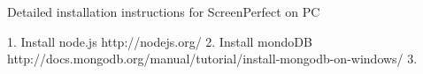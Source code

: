 Detailed installation instructions for ScreenPerfect on PC

1. Install node.js
	http://nodejs.org/ 
2. Install mondoDB
	http://docs.mongodb.org/manual/tutorial/install-mongodb-on-windows/
3. 